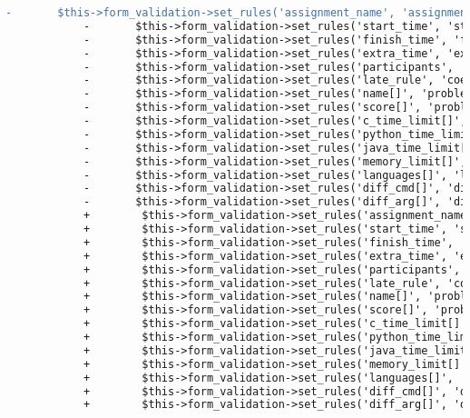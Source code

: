 \begin{lstlisting}[language=diff, caption=Perubahan pada kode Assignments.php]
			-		$this->form_validation->set_rules('assignment_name', 'assignment name', 'required|max_length[50]');
			-		$this->form_validation->set_rules('start_time', 'start time', 'required');
			-		$this->form_validation->set_rules('finish_time', 'finish time', 'required');
			-		$this->form_validation->set_rules('extra_time', 'extra time', 'required');
			-		$this->form_validation->set_rules('participants', 'participants', '');
			-		$this->form_validation->set_rules('late_rule', 'coefficient rule', 'required');
			-		$this->form_validation->set_rules('name[]', 'problem name', 'required|max_length[50]');
			-		$this->form_validation->set_rules('score[]', 'problem score', 'required|integer');
			-		$this->form_validation->set_rules('c_time_limit[]', 'C/C++ time limit', 'required|integer');
			-		$this->form_validation->set_rules('python_time_limit[]', 'python time limit', 'required|integer');
			-		$this->form_validation->set_rules('java_time_limit[]', 'java time limit', 'required|integer');
			-		$this->form_validation->set_rules('memory_limit[]', 'memory limit', 'required|integer');
			-		$this->form_validation->set_rules('languages[]', 'languages', 'required');
			-		$this->form_validation->set_rules('diff_cmd[]', 'diff command', 'required');
			-		$this->form_validation->set_rules('diff_arg[]', 'diff argument', 'required');
			+        $this->form_validation->set_rules('assignment_name', 'assignment name', 'required|max_length[50]');
			+        $this->form_validation->set_rules('start_time', 'start time', 'required');
			+        $this->form_validation->set_rules('finish_time', 'finish time', 'required');
			+        $this->form_validation->set_rules('extra_time', 'extra time', 'required');
			+        $this->form_validation->set_rules('participants', 'participants', '');
			+        $this->form_validation->set_rules('late_rule', 'coefficient rule', 'required');
			+        $this->form_validation->set_rules('name[]', 'problem name', 'required|max_length[50]');
			+        $this->form_validation->set_rules('score[]', 'problem score', 'required|integer');
			+        $this->form_validation->set_rules('c_time_limit[]', 'C/C++ time limit', 'required|integer');
			+        $this->form_validation->set_rules('python_time_limit[]', 'python time limit', 'required|integer');
			+        $this->form_validation->set_rules('java_time_limit[]', 'java time limit', 'required|integer');
			+        $this->form_validation->set_rules('memory_limit[]', 'memory limit', 'required|integer');
			+        $this->form_validation->set_rules('languages[]', 'languages', 'required');
			+        $this->form_validation->set_rules('diff_cmd[]', 'diff command', 'required');
			+        $this->form_validation->set_rules('diff_arg[]', 'diff argument', 'required');
			

\end{lstlisting}
